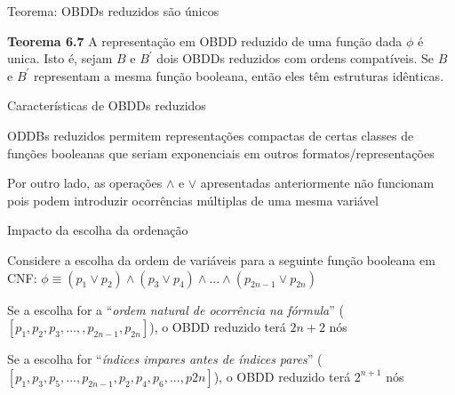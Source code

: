 \expandafter\documentclass\expandafter[table, usenames, svgnames, dvipsnames,14pt, \classopts]{beamer}
\begin{document}
\begin{frame}{Teorema: \uppercase{OBDD}s reduzidos são únicos}

    \begin{block}{\textbf{Teorema 6.7}}
        A representação em OBDD reduzido de uma função dada $\phi$ é unica. Isto é, sejam $B$ e $B^\prime$ dois OBDDs reduzidos com ordens compatíveis. Se $B$ e $B^\prime$ representam a mesma função booleana, então eles têm estruturas idênticas.
    \end{block}

\end{frame}

\begin{frame}{Características de \uppercase{OBDD}s reduzidos}

    \begin{outline}
        \1 ODDBs reduzidos permitem representações compactas de certas classes de funções booleanas
            \2[-] que seriam exponenciais em outros formatos/representações
            
        \vspace{1em}
        
        \1 Por outro lado, as operações $\land$ e $\lor$ apresentadas anteriormente não funcionam
            \2[-] pois podem introduzir ocorrências múltiplas de uma mesma variável
    \end{outline}

\end{frame}

\begin{frame}{Impacto da escolha da ordenação}

    Considere a escolha da ordem de variáveis para a seguinte função booleana em CNF:
    $\phi \equiv (p_1 \lor p_2) \land (p_3 \lor p_4) \land ... \land (p_{2n-1} \lor p_{2n})$

    \begin{outline}
        \small
        \1 Se a escolha for a ``\textit{ordem natural de ocorrência na fórmula}'' ($[p_1,p_2,p_3,...,,p_{2n-1},p_{2n}]$), o OBDD reduzido terá $2n+2$ nós
        
        \vspace{1em}
        
        \1 Se a escolha for ``\textit{índices impares antes de índices pares}'' ($[p_1,p_3,p_5,...,p_{2n-1},p_2,p_4,p_6,...,p{2n}]$), o OBDD reduzido terá $2^{n+1}$ nós
    \end{outline}
    
\end{frame}
\end{document}
